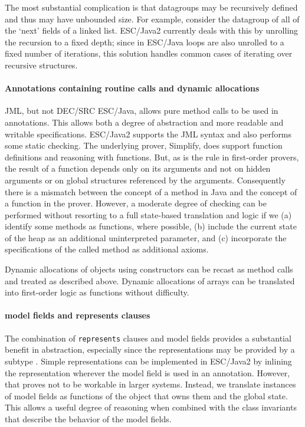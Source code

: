 \documentclass{llncs}
\begin{document}
The most substantial complication is that datagroups may be
recursively defined and thus may have unbounded size.  For example,
consider the datagroup of all of the `next' fields of a linked list.
ESC/Java2 currently deals with this by unrolling the recursion to a
fixed depth; since in ESC/Java loops are also unrolled to a fixed
number of iterations, this solution handles common cases of iterating
over recursive structures.

\paragraph*{Annotations containing routine calls and dynamic allocations}
JML, but not DEC/SRC ESC/Java, allows pure method calls to be used in
annotations.  This allows both a degree of abstraction and more
readable and writable specifications.  ESC/Java2 supports the JML
syntax and also performs some static checking.  The underlying prover,
Simplify, does support function definitions and reasoning with
functions.  But, as is the rule in first-order provers, the result of
a function depends only on its arguments and not on hidden arguments
or on global structures referenced by the arguments.  Consequently
there is a mismatch between the concept of a method in Java and the
concept of a function in the prover.  However, a moderate degree of
checking can be performed without resorting to a full state-based
translation and logic if we (a) identify some methods as functions,
where possible, (b) include the current state of the heap as an
additional uninterpreted parameter, and (c) incorporate the
specifications of the called method as additional axioms.

Dynamic allocations of objects using constructors can be recast as
method calls and treated as described above.  Dynamic allocations of
arrays can be translated into first-order logic as functions without
difficulty.

\paragraph*{model fields and represents clauses}
The combination of \texttt{represents} clauses and model fields
provides a substantial benefit in abstraction, especially since the
representations may be provided by a subtype \cite{Cheon-etal03}.
Simple representations can be implemented in ESC/Java2 by inlining the
representation wherever the model field is used in an annotation.
However, that proves not to be workable in larger systems.  Instead,
we translate instances of model fields as functions of the object that
owns them and the global state.  This allows a useful degree of
reasoning when combined with the class invariants that describe the
behavior of the model fields.
\end{document}
